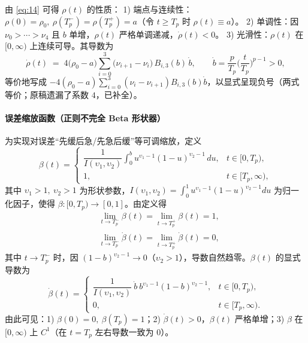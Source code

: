 \documentclass[pdflatex,sn-mathphys-num]{sn-jnl}%
\theoremstyle{thmstyleone}%
\theoremstyle{thmstyletwo}%
\theoremstyle{thmstylethree}%
\begin{document}
	由 \cref{eq:14} 可得 $\rho(t)$ 的性质：  
	1) 端点与连续性：$\rho(0)=\rho_0,\ \rho(T_p^-)=\rho(T_p^+)=a$（令 $t\ge T_p$ 时 $\rho(t)\equiv a$）。  
	2) 单调性：因 $\nu_0>\cdots>\nu_4$ 且 $b$ 单增，$\rho(t)$ 严格单调递减，$\dot\rho(t)<0$。  
	3) 光滑性：$\rho(t)$ 在 $[0,\infty)$ 上连续可导。其导数为
	\begin{equation}\label{eq:15}
	  \dot{\rho}(t)
	  \;=\; 4\big(\rho_0 - a\big)\!\sum_{i=0}^{3}\!\big(\nu_{i+1}-\nu_i\big)\,B_{i,3}(b)\,\dot b,
	  \qquad 
	  \dot b=\frac{p}{T_p}\Big(\frac{t}{T_p}\Big)^{p-1}>0,
	\end{equation}
	等价地写成 $-\!4(\rho_0-a)\sum_{i=0}^{3}(\nu_i-\nu_{i+1})B_{i,3}(b)\dot b$，以显式呈现负号（两式等价；原稿遗漏了系数 $4$，已补全）。
	
	\paragraph{误差缩放函数（正则不完全 Beta 形状器）}
	为实现对误差“先缓后急/先急后缓”等可调缩放，定义
	\begin{equation}\label{eq:16}
	  \beta(t)=
	  \begin{cases}
		\displaystyle \dfrac{1}{I(\upsilon_{1},\upsilon_{2})}\!\int_{0}^{b}\! u^{\upsilon_{1}-1}(1-u)^{\upsilon_{2}-1}\,du, & t\in[0,T_p),\\[8pt]
		1, & t\in[T_p,\infty),
	  \end{cases}
	\end{equation}
	其中 $\upsilon_{1}>1,\ \upsilon_{2}>1$ 为形状参数，$I(\upsilon_{1},\upsilon_{2})=\int_{0}^{1}u^{\upsilon_{1}-1}(1-u)^{\upsilon_{2}-1}du$ 为归一化因子，使得 $\beta:[0,T_p)\!\to[0,1]$。由定义得
	\begin{subequations}\label{eq:17}
	\begin{align}
	  &\lim_{t\to T_p^-}\beta(t)=\lim_{t\to T_p^+}\beta(t)=1,\\
	  &\lim_{t\to T_p^-}\dot\beta(t)=\lim_{t\to T_p^+}\dot\beta(t)=0,
	\end{align}
	\end{subequations}
	其中 $t\!\to\!T_p^-$ 时，因 $(1-b)^{\upsilon_2-1}\!\to\!0$（$\upsilon_2\!>\!1$），导数自然趋零。$\beta(t)$ 的显式导数为
	\begin{equation}\label{eq:18}
	  \dot\beta(t)=
	  \begin{cases}
		\dfrac{1}{I(\upsilon_{1},\upsilon_{2})}\ \dot b\ b^{\upsilon_{1}-1}(1-b)^{\upsilon_{2}-1}, & t\in[0,T_p),\\[6pt]
		0, & t\in[T_p,\infty).
	  \end{cases}
	\end{equation}
	由此可见：1) $\beta(0)=0,\ \beta(T_p)=1$；2) $\dot\beta(t)>0$，$\beta(t)$ 严格单增；3) $\beta$ 在 $[0,\infty)$ 上 $C^1$（在 $t=T_p$ 左右导数一致为 $0$）。
	
\end{document}
